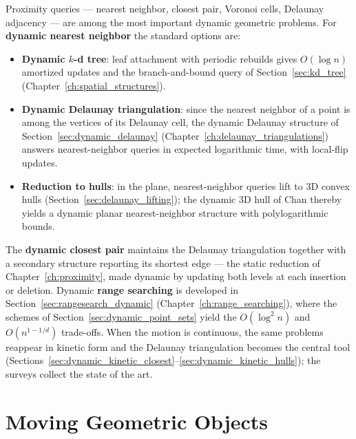 Proximity queries --- nearest neighbor, closest pair, Voronoi cells,
Delaunay adjacency --- are among the most important dynamic geometric
problems. For \textbf{dynamic nearest neighbor} the standard options are:

\begin{itemize}
  \item \textbf{Dynamic $k$-d tree}: leaf attachment with periodic rebuilds
    gives $O(\log n)$ amortized updates and the branch-and-bound query of
    Section~\ref{sec:kd_tree} (Chapter~\ref{ch:spatial_structures}).
  \item \textbf{Dynamic Delaunay triangulation}: since the nearest neighbor
    of a point is among the vertices of its Delaunay cell, the dynamic
    Delaunay structure of Section~\ref{sec:dynamic_delaunay}
    (Chapter~\ref{ch:delaunay_triangulations}) answers nearest-neighbor
    queries in expected logarithmic time, with local-flip updates.
  \item \textbf{Reduction to hulls}: in the plane, nearest-neighbor queries
    lift to 3D convex hulls (Section~\ref{sec:delaunay_lifting}); the
    dynamic 3D hull of Chan \cite{chan2006} thereby yields a dynamic planar
    nearest-neighbor structure with polylogarithmic bounds.
\end{itemize}

The \textbf{dynamic closest pair} maintains the
Delaunay triangulation together with a secondary structure reporting its
shortest edge --- the static reduction of Chapter~\ref{ch:proximity}, made
dynamic by updating both levels at each insertion or deletion. Dynamic
\textbf{range searching} is developed in Section~\ref{sec:rangesearch_dynamic}
(Chapter~\ref{ch:range_searching}), where the schemes of
Section~\ref{sec:dynamic_point_sets} yield the $O(\log^2 n)$ and
$O(n^{1-1/d})$ trade-offs. When the motion is continuous, the same problems
reappear in kinetic form and the Delaunay triangulation becomes the central
tool (Sections~\ref{sec:dynamic_kinetic_closest}--\ref{sec:dynamic_kinetic_hulls});
the surveys \cite{guibas1998,mehta2005} collect the state of the art.


\section{Moving Geometric Objects}
\label{sec:dynamic_moving_objects}


